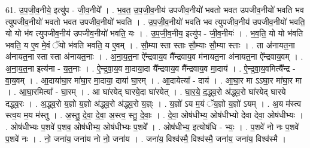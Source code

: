 \documentclass[17pt]{extarticle}
\begin{document}
61. उ॒प॒जी॒व॒नीये॒ इत्यु॑प - जी॒व॒नीये᳚ । . भ॒व॒त॒ उ॒प॒जी॒व॒नीय॑ उपजीव॒नीयो॑ भवतो भवत उपजीव॒नीयो॑ भवति भव त्युपजीव॒नीयो॑ भवतो भवत उपजीव॒नीयो॑ भवति । . उ॒प॒जी॒व॒नीयो॑ भवति भव त्युपजीव॒नीय॑ उपजीव॒नीयो॑ भवति॒ यो यो भ॑व त्युपजीव॒नीय॑ उपजीव॒नीयो॑ भवति॒ यः । . उ॒प॒जी॒व॒नीय॒ इत्यु॑प - जी॒व॒नीयः॑ । . भ॒व॒ति॒ यो यो भ॑वति भवति॒ य ए॒व मे॒वं ॅयो भ॑वति भवति॒ य ए॒वम् । . सौ॒म्या स्ता स्ताः सौ॒म्याः सौ॒म्या स्ताः । . ता अ॑नायत॒ना अ॑नायत॒ना स्ता स्ता अ॑नायत॒नाः । . अ॒ना॒य॒त॒ना ऐ᳚न्द्रवाय॒व मै᳚न्द्रवाय॒व म॑नायत॒ना अ॑नायत॒ना ऐ᳚न्द्रवाय॒वम् । . अ॒ना॒य॒त॒ना इत्य॑ना - य॒त॒नाः । . ऐ॒न्द्र॒वा॒य॒व मा॒दाया॒दा यै᳚न्द्रवाय॒व मै᳚न्द्रवाय॒व मा॒दाय॑ । . ऐ॒न्द्र॒वा॒य॒वमित्यै᳚न्द्र - वा॒य॒वम् । . आ॒दाया॑घा॒र मा॑घा॒र मा॒दाया॒ दाया॑ घा॒रम् । . आ॒दायेत्या᳚ - दाय॑ । . आ॒घा॒र मा ऽऽघा॒र मा॑घा॒र मा । . आ॒घा॒रमित्या᳚ - घा॒रम् । . आ घा॑रयेद् घारये॒दा घा॑रयेत् । . घा॒र॒ये॒ द॒द्ध्व॒रो अ॑द्ध्व॒रो घा॑रयेद् घारये दद्ध्व॒रः । . अ॒द्ध्व॒रो य॒ज्ञो य॒ज्ञो अ॑द्ध्व॒रो अ॑द्ध्व॒रो य॒ज्ञ्ः । . य॒ज्ञो॑ ऽय म॒यं ॅय॒ज्ञो य॒ज्ञो॑ ऽयम् । . अ॒य म॑स्त्व स्त्व॒य म॒य म॑स्तु । . अ॒स्तु॒ दे॒वा॒ दे॒वा॒ अ॒स्त्व॒ स्तु॒ दे॒वाः॒ । . दे॒वा॒ ओष॑धीभ्य॒ ओष॑धीभ्यो देवा देवा॒ ओष॑धीभ्यः । . ओष॑धीभ्यः प॒शवे॑ प॒शव॒ ओष॑धीभ्य॒ ओष॑धीभ्यः प॒शवे᳚ । . ओष॑धीभ्य॒ इत्योष॑धि - भ्यः॒ । . प॒शवे॑ नो नः प॒शवे॑ प॒शवे॑ नः । . नो॒ जना॑य॒ जना॑य नो नो॒ जना॑य । . जना॑य॒ विश्व॑स्मै॒ विश्व॑स्मै॒ जना॑य॒ जना॑य॒ विश्व॑स्मै । \newline
\end{document}
